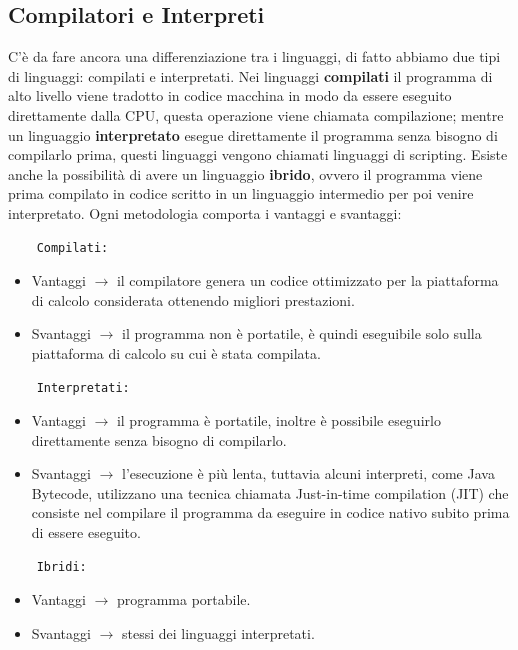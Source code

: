 \subsection{Compilatori e Interpreti}
C’è da fare ancora una differenziazione tra i linguaggi, di fatto abbiamo due tipi di linguaggi: compilati e interpretati. Nei linguaggi \textbf{compilati} il programma di alto livello viene tradotto in codice macchina in modo da essere eseguito direttamente dalla CPU, questa operazione viene chiamata compilazione; mentre un linguaggio \textbf{interpretato} esegue direttamente il programma senza bisogno di compilarlo prima, questi linguaggi vengono chiamati linguaggi di scripting. Esiste anche la possibilità di avere un linguaggio \textbf{ibrido}, ovvero il programma viene prima compilato in codice scritto in un linguaggio intermedio per poi venire interpretato. Ogni metodologia comporta i vantaggi e svantaggi:
\begin{verbatim}
    Compilati:
\end{verbatim}
\begin{itemize}
    \item Vantaggi $\xrightarrow{}$ il compilatore genera un codice ottimizzato per la piattaforma di calcolo considerata ottenendo migliori prestazioni.
    \item Svantaggi $\xrightarrow{}$ il programma non è portatile, è quindi eseguibile solo sulla piattaforma di calcolo su cui è stata compilata.
\end{itemize}
\begin{verbatim}
    Interpretati:
\end{verbatim}
\begin{itemize}
    \item Vantaggi $\xrightarrow{}$ il programma è portatile, inoltre è possibile eseguirlo direttamente senza bisogno di compilarlo.
    \item Svantaggi $\xrightarrow{}$ l’esecuzione è più lenta, tuttavia alcuni interpreti, come Java Bytecode, utilizzano una tecnica chiamata Just-in-time compilation (JIT) che consiste nel compilare il programma da eseguire in codice nativo subito prima di essere eseguito.
\end{itemize}
\begin{verbatim}
    Ibridi:
\end{verbatim}
\begin{itemize}
    \item Vantaggi $\xrightarrow{}$ programma portabile. 
    \item Svantaggi $\xrightarrow{}$ stessi dei linguaggi interpretati.
\end{itemize}
